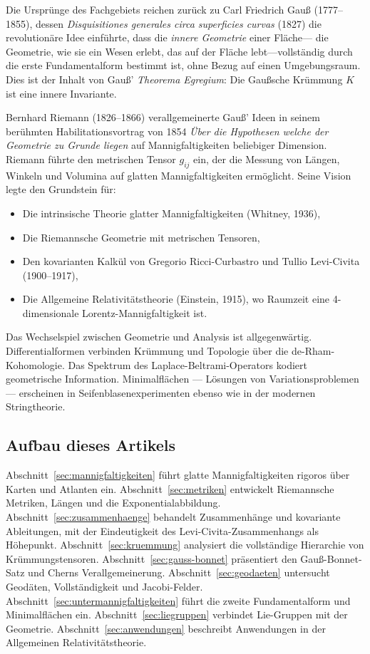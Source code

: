 \documentclass[12pt,a4paper]{amsart}
\theoremstyle{definition}
\begin{document}
Die Ursprünge des Fachgebiets reichen zurück zu Carl Friedrich Gauß (1777--1855),
dessen \emph{Disquisitiones generales circa superficies curvas} (1827) die
revolutionäre Idee einführte, dass die \emph{innere Geometrie} einer Fläche---
die Geometrie, wie sie ein Wesen erlebt, das auf der Fläche lebt---vollständig
durch die erste Fundamentalform bestimmt ist, ohne Bezug auf einen Umgebungsraum.
Dies ist der Inhalt von Gauß' \emph{Theorema Egregium}: Die Gaußsche Krümmung $K$
ist eine innere Invariante.

Bernhard Riemann (1826--1866) verallgemeinerte Gauß' Ideen in seinem berühmten
Habilitationsvortrag von 1854 \emph{Über die Hypothesen welche der Geometrie
zu Grunde liegen} auf Mannigfaltigkeiten beliebiger Dimension. Riemann führte
den metrischen Tensor $g_{ij}$ ein, der die Messung von Längen, Winkeln und
Volumina auf glatten Mannigfaltigkeiten ermöglicht. Seine Vision legte den Grundstein für:
\begin{itemize}
  \item Die intrinsische Theorie glatter Mannigfaltigkeiten (Whitney, 1936),
  \item Die Riemannsche Geometrie mit metrischen Tensoren,
  \item Den kovarianten Kalkül von Gregorio Ricci-Curbastro und Tullio
        Levi-Civita (1900--1917),
  \item Die Allgemeine Relativitätstheorie (Einstein, 1915), wo Raumzeit
        eine 4-dimensionale Lorentz-Mannigfaltigkeit ist.
\end{itemize}

Das Wechselspiel zwischen Geometrie und Analysis ist allgegenwärtig. Differentialformen
verbinden Krümmung und Topologie über die de-Rham-Kohomologie. Das Spektrum des
Laplace-Beltrami-Operators kodiert geometrische Information. Minimalflächen ---
Lösungen von Variationsproblemen --- erscheinen in Seifenblasenexperimenten
ebenso wie in der modernen Stringtheorie.

\subsection{Aufbau dieses Artikels}

Abschnitt~\ref{sec:mannigfaltigkeiten} führt glatte Mannigfaltigkeiten rigoros
über Karten und Atlanten ein. Abschnitt~\ref{sec:metriken} entwickelt Riemannsche
Metriken, Längen und die Exponentialabbildung. Abschnitt~\ref{sec:zusammenhaenge}
behandelt Zusammenhänge und kovariante Ableitungen, mit der Eindeutigkeit des
Levi-Civita-Zusammenhangs als Höhepunkt. Abschnitt~\ref{sec:kruemmung} analysiert
die vollständige Hierarchie von Krümmungstensoren.
Abschnitt~\ref{sec:gauss-bonnet} präsentiert den Gauß-Bonnet-Satz und Cherns
Verallgemeinerung. Abschnitt~\ref{sec:geodaeten} untersucht Geodäten,
Vollständigkeit und Jacobi-Felder. Abschnitt~\ref{sec:untermannigfaltigkeiten}
führt die zweite Fundamentalform und Minimalflächen ein.
Abschnitt~\ref{sec:liegruppen} verbindet Lie-Gruppen mit der Geometrie.
Abschnitt~\ref{sec:anwendungen} beschreibt Anwendungen in der Allgemeinen
Relativitätstheorie.
\end{document}
